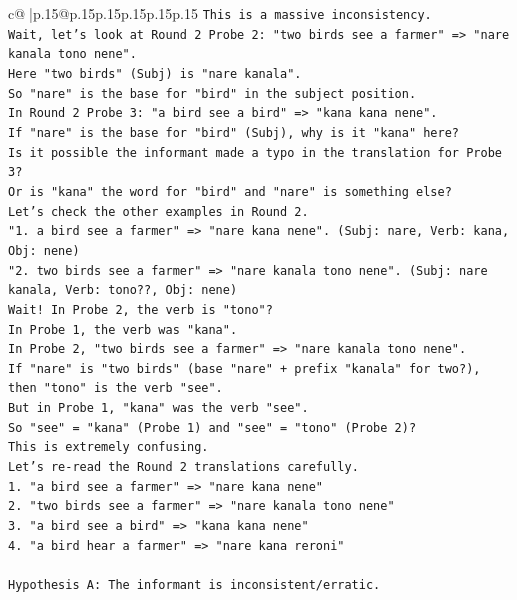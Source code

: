\documentclass{article}
\begin{document}
{\begin{supertabular}{c@{$\;$}|p{.15\linewidth}@{}p{.15\linewidth}p{.15\linewidth}p{.15\linewidth}p{.15\linewidth}p{.15\linewidth}}
{{{\texttt{This is a massive inconsistency.} \\
\texttt{Wait, let's look at Round 2 Probe 2: "two birds see a farmer" => "nare kanala tono nene".} \\
\texttt{Here "two birds" (Subj) is "nare kanala".} \\
\texttt{So "nare" is the base for "bird" in the subject position.} \\
\texttt{In Round 2 Probe 3: "a bird see a bird" => "kana kana nene".} \\
\texttt{If "nare" is the base for "bird" (Subj), why is it "kana" here?} \\
\texttt{Is it possible the informant made a typo in the translation for Probe 3?} \\
\texttt{Or is "kana" the word for "bird" and "nare" is something else?} \\
\texttt{Let's check the other examples in Round 2.} \\
\texttt{"1. a bird see a farmer" => "nare kana nene". (Subj: nare, Verb: kana, Obj: nene)} \\
\texttt{"2. two birds see a farmer" => "nare kanala tono nene". (Subj: nare kanala, Verb: tono??, Obj: nene)} \\
\texttt{Wait! In Probe 2, the verb is "tono"?} \\
\texttt{In Probe 1, the verb was "kana".} \\
\texttt{In Probe 2, "two birds see a farmer" => "nare kanala tono nene".} \\
\texttt{If "nare" is "two birds" (base "nare" + prefix "kanala" for two?), then "tono" is the verb "see".} \\
\texttt{But in Probe 1, "kana" was the verb "see".} \\
\texttt{So "see" = "kana" (Probe 1) and "see" = "tono" (Probe 2)?} \\
\texttt{This is extremely confusing.} \\
\texttt{Let's re{-}read the Round 2 translations carefully.} \\
\texttt{1. "a bird see a farmer" => "nare kana nene"} \\
\texttt{2. "two birds see a farmer" => "nare kanala tono nene"} \\
\texttt{3. "a bird see a bird" => "kana kana nene"} \\
\texttt{4. "a bird hear a farmer" => "nare kana reroni"} \\
\\ 
\texttt{Hypothesis A: The informant is inconsistent/erratic.} \\
}}}
\end{supertabular}}
\end{document}
